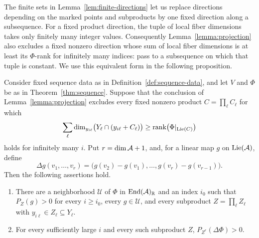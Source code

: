 The finite sets in Lemma~\ref{lem:finite-directions} let us replace
directions depending on the marked points and subproducts by one
fixed direction along a subsequence. For a fixed product direction,
the tuple of local fiber dimensions takes only finitely many integer
values. Consequently
Lemma~\ref{lemma:projection} also excludes a fixed nonzero direction
whose sum of local fiber dimensions is at least its $\Phi$-rank for
infinitely many indices: pass to a subsequence on which that tuple is
constant. We use this equivalent form in the following proposition.

\begin{proposition}\label{prop:tangent}
Consider fixed sequence data as in Definition~\ref{def:sequence-data},
and let $V$ and $\Phi$ be as in Theorem~\ref{thm:sequence}.
Suppose that the conclusion of Lemma~\ref{lemma:projection} excludes
every fixed nonzero product $C=\prod_\ell C_\ell$ for which
\begin{equation}\label{eq:excluded-tangent-configuration}
 \sum_\ell\dim_{y_{i\ell}}
 \bigl(Y_\ell\cap(y_{i\ell}+C_\ell)\bigr)
 \geq\operatorname{rank}\bigl(\Phi|_{\operatorname{Lie}(C)}\bigr)
\end{equation}
holds for infinitely many $i$.
Put $r=\dim\mathcal A+1$, and, for a linear map $g$ on $\operatorname{Lie}(\mathcal A)$, define
\[
 \Delta g(v_1,\ldots,v_r)
   =\bigl(g(v_2)-g(v_1),\ldots,g(v_r)-g(v_{r-1})\bigr).
\]
Then the following assertions hold.
\begin{enumerate}
 \item There are a neighborhood $\mathcal U$ of $\Phi$ in
 $\operatorname{End}(\mathcal A)_{\mathbb R}$ and an index $i_0$ such that
 $P_Z(g)>0$ for every $i\geq i_0$, every $g\in\mathcal U$, and every
 subproduct $Z=\prod_\ell Z_\ell$ with
 $y_{i\ell}\in Z_\ell\subseteq Y_\ell$.
 \item For every sufficiently large $i$ and every such subproduct $Z$,
 $P_{Z^r}(\Delta\Phi)>0$.
\end{enumerate}
\end{proposition}

